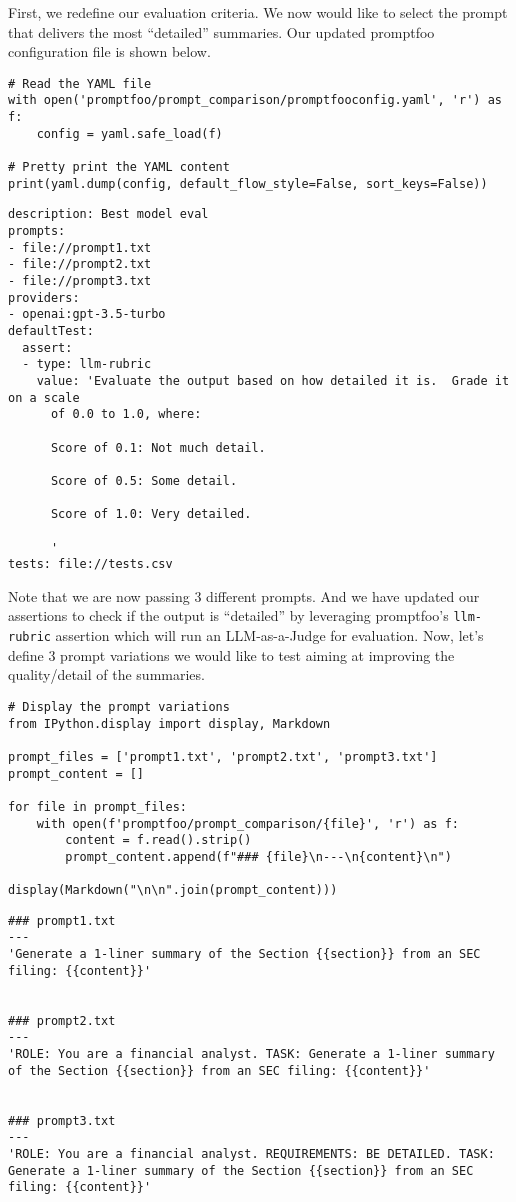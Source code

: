 First, we redefine our evaluation criteria. We now would like to select the prompt that delivers the most ``detailed'' summaries. Our updated promptfoo configuration file is shown below.

\begin{verbatim}
# Read the YAML file
with open('promptfoo/prompt_comparison/promptfooconfig.yaml', 'r') as f:
    config = yaml.safe_load(f)

# Pretty print the YAML content
print(yaml.dump(config, default_flow_style=False, sort_keys=False))
\end{verbatim}

\begin{verbatim}
description: Best model eval
prompts:
- file://prompt1.txt
- file://prompt2.txt
- file://prompt3.txt
providers:
- openai:gpt-3.5-turbo
defaultTest:
  assert:
  - type: llm-rubric
    value: 'Evaluate the output based on how detailed it is.  Grade it on a scale
      of 0.0 to 1.0, where:

      Score of 0.1: Not much detail.

      Score of 0.5: Some detail.

      Score of 1.0: Very detailed.

      '
tests: file://tests.csv
\end{verbatim}
    

Note that we are now passing 3 different prompts. And we have updated our assertions to check if the output is ``detailed'' by leveraging promptfoo's \texttt{llm-rubric} assertion which will run an LLM-as-a-Judge for evaluation. Now, let's define 3 prompt variations we would like to test aiming at improving the quality/detail of the summaries.

\begin{verbatim}
# Display the prompt variations
from IPython.display import display, Markdown

prompt_files = ['prompt1.txt', 'prompt2.txt', 'prompt3.txt']
prompt_content = []

for file in prompt_files:
    with open(f'promptfoo/prompt_comparison/{file}', 'r') as f:
        content = f.read().strip()
        prompt_content.append(f"### {file}\n---\n{content}\n")

display(Markdown("\n\n".join(prompt_content)))
\end{verbatim}

\begin{verbatim}
### prompt1.txt
---
'Generate a 1-liner summary of the Section {{section}} from an SEC filing: {{content}}'


### prompt2.txt
---
'ROLE: You are a financial analyst. TASK: Generate a 1-liner summary of the Section {{section}} from an SEC filing: {{content}}'


### prompt3.txt
---
'ROLE: You are a financial analyst. REQUIREMENTS: BE DETAILED. TASK: Generate a 1-liner summary of the Section {{section}} from an SEC filing: {{content}}'
\end{verbatim}



